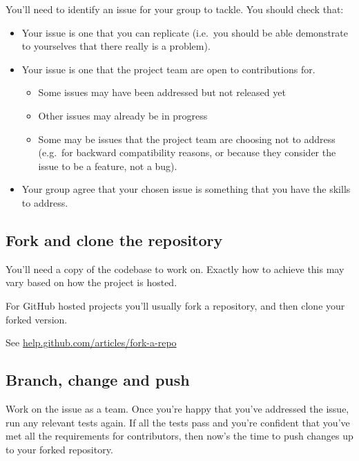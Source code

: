 \documentclass[
]{book}
\providecommand{\tightlist}{%
  \setlength{\itemsep}{0pt}\setlength{\parskip}{0pt}}
\begin{document}
You'll need to identify an issue for your group to tackle. You should check that:

\begin{itemize}
\tightlist
\item
  Your issue is one that you can replicate (i.e.~you should be able demonstrate to yourselves that there really is a problem).
\item
  Your issue is one that the project team are open to contributions for.

  \begin{itemize}
  \tightlist
  \item
    Some issues may have been addressed but not released yet
  \item
    Other issues may already be in progress
  \item
    Some may be issues that the project team are choosing not to address (e.g.~for backward compatibility reasons, or because they consider the issue to be a feature, not a bug).
  \end{itemize}
\item
  Your group agree that your chosen issue is something that you have the skills to address.
\end{itemize}

\hypertarget{forklone}{%
\subsection{Fork and clone the repository}\label{forklone}}

You'll need a copy of the codebase to work on. Exactly how to achieve this may vary based on how the project is hosted.

For GitHub hosted projects you'll usually fork a repository, and then clone your forked version.

See \href{https://help.github.com/articles/fork-a-repo/}{help.github.com/articles/fork-a-repo}

\hypertarget{bcp}{%
\subsection{Branch, change and push}\label{bcp}}

Work on the issue as a team. Once you're happy that you've addressed the issue, run any relevant tests again. If all the tests pass and you're confident that you've met all the requirements for contributors, then now's the time to push changes up to your forked repository.
\end{document}

